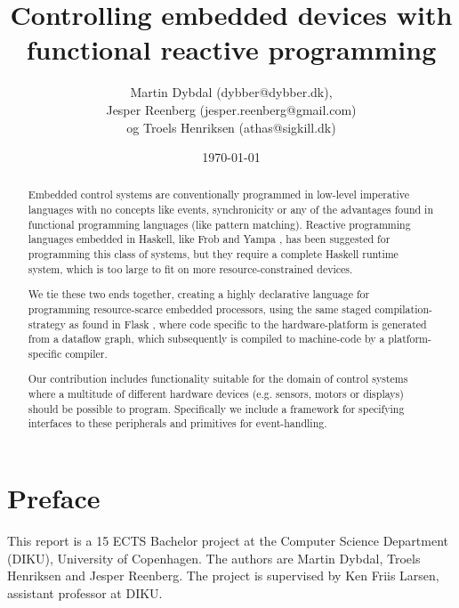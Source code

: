 \documentclass[a4paper, oneside, final]{memoir}
\title{Controlling embedded devices with functional reactive programming}
\author{Martin Dybdal (dybber@dybber.dk), \\
Jesper Reenberg (jesper.reenberg@gmail.com) \\ og
Troels Henriksen (athas@sigkill.dk)}
\date{\today}
\begin{document}
\frontmatter

\maketitle
\thispagestyle{empty}

\begin{abstract}
  Embedded control systems are conventionally programmed in low-level
  imperative languages with no concepts like events, synchronicity or
  any of the advantages found in functional programming languages
  (like pattern matching). Reactive programming languages embedded in
  Haskell, like Frob \cite{frob99} and Yampa \cite{arrowsrobotsfrp02},
  has been suggested for programming this class of systems, but they
  require a complete Haskell runtime system, which is too large to fit
  on more resource-constrained devices.

  We tie these two ends together, creating a highly declarative
  language for programming resource-scarce embedded processors, using
  the same staged com\-pi\-la\-tion-strategy as found in Flask
  \cite{flask08}, where code specific to the hardware-platform is
  generated from a dataflow graph, which subsequently is compiled to
  machine-code by a platform-specific compiler.

  Our contribution includes functionality suitable for the domain of
  control systems where a multitude of different hardware devices
  (e.g. sensors, motors or displays) should be possible to
  program. Specifically we include a framework for specifying
  interfaces to these peripherals and primitives for
  event-handling. 

\end{abstract}

\clearpage 
\chapter*{Preface}
This report is a 15 ECTS Bachelor project at the Computer Science
Department (DIKU), University of Copenhagen. The authors are Martin
Dybdal, Troels Henriksen and Jesper Reenberg. The project is
supervised by Ken Friis Larsen, assistant professor at DIKU.

\clearpage

\tableofcontents*



\end{document}
